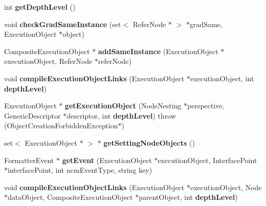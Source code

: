 \begin{CompactItemize}
\item 
int \textbf{getDepthLevel} ()\label{classbr_1_1pucrio_1_1telemidia_1_1ginga_1_1ncl_1_1emconverter_1_1FormatterConverter_ac5a7abaf1bd5e762c9b23ebd5b562ed}

\item 
void \textbf{checkGradSameInstance} (set$<$ ReferNode $\ast$ $>$ $\ast$gradSame, ExecutionObject $\ast$object)\label{classbr_1_1pucrio_1_1telemidia_1_1ginga_1_1ncl_1_1emconverter_1_1FormatterConverter_d7afdbc4c6d9d232f74932fe8032f602}

\item 
CompositeExecutionObject $\ast$ \textbf{addSameInstance} (ExecutionObject $\ast$executionObject, ReferNode $\ast$referNode)\label{classbr_1_1pucrio_1_1telemidia_1_1ginga_1_1ncl_1_1emconverter_1_1FormatterConverter_2cbef3fea16a4351e6564deef0d8bb52}

\item 
void \textbf{compileExecutionObjectLinks} (ExecutionObject $\ast$executionObject, int {\bf depthLevel})\label{classbr_1_1pucrio_1_1telemidia_1_1ginga_1_1ncl_1_1emconverter_1_1FormatterConverter_bcdc5fb3b216292279ced203cadd5297}

\item 
ExecutionObject $\ast$ \textbf{getExecutionObject} (NodeNesting $\ast$perspective, GenericDescriptor $\ast$descriptor, int {\bf depthLevel})  throw (ObjectCreationForbiddenException$\ast$)\label{classbr_1_1pucrio_1_1telemidia_1_1ginga_1_1ncl_1_1emconverter_1_1FormatterConverter_f725abf9aa7e08f31b0b54b5fce47e2a}

\item 
set$<$ ExecutionObject $\ast$ $>$ $\ast$ \textbf{getSettingNodeObjects} ()\label{classbr_1_1pucrio_1_1telemidia_1_1ginga_1_1ncl_1_1emconverter_1_1FormatterConverter_57493e624442dff0b5b14de5bb08003b}

\item 
FormatterEvent $\ast$ \textbf{getEvent} (ExecutionObject $\ast$executionObject, InterfacePoint $\ast$interfacePoint, int ncmEventType, string key)\label{classbr_1_1pucrio_1_1telemidia_1_1ginga_1_1ncl_1_1emconverter_1_1FormatterConverter_6c731b841843e6f7465fa7bc442c0954}

\item 
void \textbf{compileExecutionObjectLinks} (ExecutionObject $\ast$executionObject, Node $\ast$dataObject, CompositeExecutionObject $\ast$parentObject, int {\bf depthLevel})\label{classbr_1_1pucrio_1_1telemidia_1_1ginga_1_1ncl_1_1emconverter_1_1FormatterConverter_953da82e9b57653d1ad8a8dde1f77531}


\end{CompactItemize}

